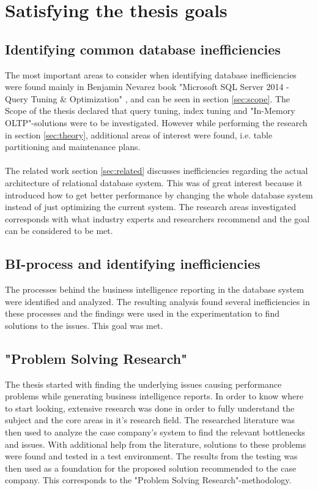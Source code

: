 \documentclass{cslthse-msc}
\begin{document}
\section{Satisfying the thesis goals}

\subsection{Identifying common database inefficiencies}
The most important areas to consider when identifying database inefficiencies were found mainly in Benjamin Nevarez book "Microsoft SQL Server 2014 - Query Tuning \& Optimization" \cite{Nevarez}, and can be seen in section \ref{sec:scope}. The Scope of the thesis declared that query tuning, index tuning and "In-Memory OLTP"-solutions were to be investigated. However while performing the research in section \ref{sec:theory}, additional areas of interest were found, i.e. table partitioning and maintenance plans. \\\\
The related work section \ref{sec:related} discusses inefficiencies regarding the actual architecture of relational database system. This was of great interest because it introduced how to get better performance by changing the whole database system instead of just optimizing the current system. The research areas investigated corresponds with what industry experts and researchers recommend and the goal can be considered to be met.

\subsection{BI-process and identifying inefficiencies}
The processes behind the business intelligence reporting in the database system were identified and analyzed. The resulting analysis found several inefficiencies in these processes and the findings were used in the experimentation to find solutions to the issues. This goal was met.

\subsection{"Problem Solving Research"}
The thesis started with finding the underlying issues causing performance problems while generating business intelligence reports. In order to know where to start looking, extensive research was done in order to fully understand the subject and the core areas in it's research field. The researched literature was then used to analyze the case company's system to find the relevant bottlenecks and issues. With additional help from the literature, solutions to these problems were found and tested in a test environment. The results from the testing was then used as a foundation for the proposed solution recommended to the case company. This corresponds to the "Problem Solving Research"-methodology.  
\end{document}
